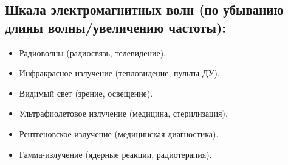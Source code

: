 \documentclass[a4paper,12pt]{article}
\begin{document}
\subsection*{Шкала электромагнитных волн (по убыванию длины волны/увеличению частоты):}
\vspace{-3pt}
\begin{itemize}
    \item Радиоволны (радиосвязь, телевидение).
    \item Инфракрасное излучение (тепловидение, пульты ДУ).
    \item Видимый свет (зрение, освещение).
    \item Ультрафиолетовое излучение (медицина, стерилизация).
    \item Рентгеновское излучение (медицинская диагностика).
    \item Гамма-излучение (ядерные реакции, радиотерапия).
\end{itemize}
\end{document}
